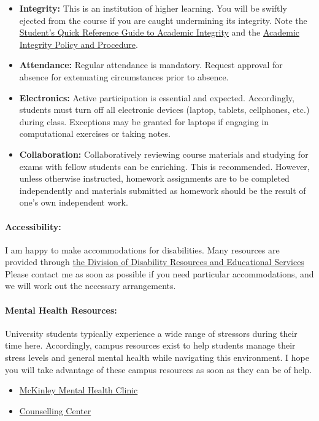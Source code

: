 \documentclass[11pt, a4paper]{article}
\begin{document}
\begin{itemize}
\item[] \textbf{Integrity:} This is an institution of higher
learning. You will be swiftly ejected from the course if you are caught
undermining its integrity. Note the
\href{http://www.provost.illinois.edu/academicintegrity/students.html}{Student's
Quick Reference Guide to Academic Integrity} and the
\href{http://studentcode.illinois.edu/article1_part4_1-401.html}{Academic
Integrity Policy and Procedure}.  
\item[] \textbf{Attendance:} Regular attendance is mandatory. Request approval for absence for extenuating circumstances prior to absence.
\item[] \textbf{Electronics:} Active participation is essential and expected. 
        Accordingly, students must turn off all electronic devices (laptop, 
        tablets, cellphones, etc.) during class. Exceptions may be granted for 
        laptops if engaging in computational exercises or taking notes. 
\item[] \textbf{Collaboration:} Collaboratively reviewing course materials and studying for exams with fellow students can be enriching.  This is recommended.  However, unless otherwise instructed, homework assignments are to be completed independently and materials submitted as homework should be the result of one's own independent work.
\end{itemize}

\paragraph{Accessibility:} I am happy to make accommodations for disabilities.
Many resources are provided through \href{http://disability.illinois.edu/academic-support/accommodations}{the Division of Disability Resources and Educational Services}
Please contact me as soon as possible if you need particular accommodations,
and we will work out the necessary arrangements.

\paragraph{Mental Health Resources:} 
University students typically experience a wide range of stressors during their 
time here. Accordingly, campus resources exist to help students manage their 
stress levels and general mental health while navigating this environment. I 
hope you will take advantage of these campus resources as soon as they can be 
of help.

\begin{itemize}
\item \href{http://www.mckinley.illinois.edu/clinics/mental\_health.htm}{McKinley Mental Health Clinic}
\item \href{http://counselingcenter.illinois.edu/}{Counselling Center}
\end{itemize}
\end{document}

